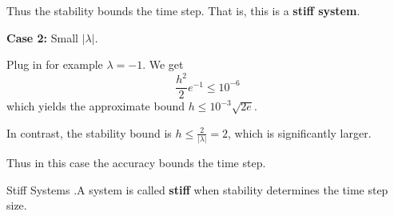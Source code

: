 \documentclass[12pt,letterpaper]{article}
\begin{document}
Thus the stability bounds the time step. That is, this is a \textbf{stiff system}.

\textbf{Case 2:} Small $\lvert \lambda \rvert$.

Plug in for example $\lambda = -1$. We get
\begin{equation}
	\frac{h^2}{2} e^{-1} \leq 10^{-6}
\end{equation}
which yields the approximate bound $h \leq 10^{-3} \sqrt{2e}$.

In contrast, the stability bound is $h \leq \frac{2}{\lvert \lambda \rvert} = 2$, which is significantly larger.

Thus in this case the accuracy bounds the time step.

\begin{defn}{Stiff Systems}
.A system is called \textbf{stiff} when stability determines the time step size.
\end{defn}
\end{document}
